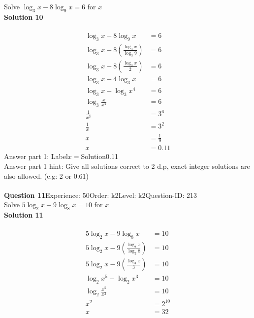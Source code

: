 \documentclass{article}
\begin{document}
Solve $\log_{3}x-8\log_{9}x=6$ for $x$\\[4pt]
\noindent\textbf{Solution 10}\\[2pt]
\\[-35pt]\begin{align*}
\log_{3}x-8\log_{9}x&=6\\[2pt]
\log_{3}x-8\left(\displaystyle\frac{\log_{3}x}{\log_{3}9}\right)&=6\\[2pt]
\log_{3}x-8\left(\displaystyle\frac{\log_{3}x}{2}\right)&=6\\[2pt]
\log_{3}x-4\log_{3}x&=6\\[2pt]
\log_{3}x-\log_{3}x^4&=6\\[2pt]
\log_{3}\displaystyle\frac{x}{x^4}&=6\\[2pt]
\displaystyle\frac{1}{x^3}&=3^6\\[2pt]
\displaystyle\frac{1}{x}&=3^2\\[2pt]
x&=\displaystyle\frac{1}{9}\\[2pt]
x&=0.11
\end{align*}
Answer part 1: \hspace{10pt}Label\hspace{10pt}$x=$\hspace{10pt}Solution\hspace{10pt}0.11\\
Answer part 1 hint: \hspace{15pt}Give all solutions correct to 2 d.p, exact integer solutions are also allowed. (e.g: 2 or 0.61)\\
\\[4pt]
\noindent\textbf{Question 11}\hspace{20pt}Experience: 50\hspace{20pt}Order: k2\hspace{20pt}Level: k2\hspace{20pt}Question-ID: 213\\[2pt]
Solve $5\log_{2}x-9\log_{8}x=10$ for $x$\\[4pt]
\noindent\textbf{Solution 11}\\[2pt]
\\[-35pt]\begin{align*}
5\log_{2}x-9\log_{8}x&=10\\[2pt]
5\log_{2}x-9\left(\displaystyle\frac{\log_{2}x}{\log_{2}8}\right)&=10\\[2pt]
5\log_{2}x-9\left(\displaystyle\frac{\log_{4}x}{3}\right)&=10\\[2pt]
\log_{2}x^5-\log_{2}x^3&=10\\[2pt]
\log_{2}\displaystyle\frac{x^5}{x^3}&=10\\[2pt]
x^2&=2^{10}\\[2pt]
x&=32\\[2pt]
\end{align*}
\end{document}
